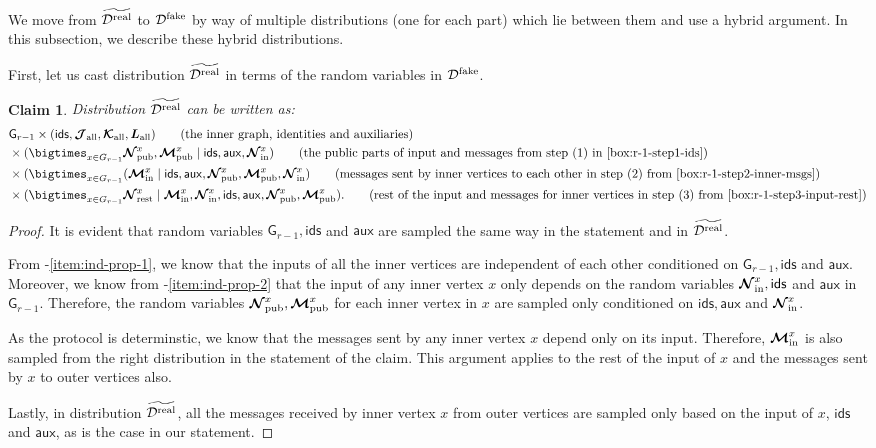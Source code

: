 \documentclass[11pt]{article}
\newtheorem{claim}[lemma]{Claim}
\theoremstyle{definition}
\newcommand{\rv}[1]{\ensuremath{{\mathsf{#1}}}\xspace}
\newcommand{\rNinner}[2]{\ensuremath{\bm{\mathcal{N}}_{\textnormal{in}}^{#1_{#2}}}}
\newcommand{\cD}{\ensuremath{\mathcal{D}}}
\newcommand{\cDreal}{\ensuremath{\cD^{\textnormal{real}}}}
\newcommand{\cDrealtil}{\ensuremath{\widetilde{\cDreal}}}
\newcommand{\cDfake}{\ensuremath{\cD^{\textnormal{fake}}}}
\newcommand{\raux}{\ensuremath{\rv{aux}}}
\newcommand{\rcJall}{\ensuremath{\bm{\mathcal{J}}_{\textnormal{all}}}}
\newcommand{\rcKall}{\ensuremath{\bm{\mathcal{K}}_{\textnormal{all}}}}
\newcommand{\rLall}{\ensuremath{\bm{L}_{\textnormal{all}}}}
\newcommand{\rNpub}[1]{\ensuremath{\bm{\mathcal{N}}_{\textnormal{pub}}^{#1}}}
\newcommand{\rMpub}[1]{\ensuremath{\bm{\mathcal{M}}_{\textnormal{pub}}^{#1}}}
\newcommand{\rMinner}[1]{\ensuremath{\bm{\mathcal{M}}_{\textnormal{in}}^{#1}}}
\newcommand{\rNrest}[1]{\ensuremath{\bm{\mathcal{N}}^{#1}_{\textnormal{rest}}}}
\newcommand{\rG}{\ensuremath{\rv{G}}}
\newcommand{\rids}{\ensuremath{\rv{ids}}}
\begin{document}
We move from $\cDrealtil$ to $\cDfake$ by way of multiple distributions (one for each part) which lie between them and use a hybrid argument. In this subsection, we describe these hybrid distributions. 

First, let us cast distribution $\cDrealtil $ in terms of the random variables in $\cDfake$.

\begin{claim}\label{clm:cDrealtil-new-way}
	Distribution $\cDrealtil$ can be written as:
	\begin{align*}
		&\rG_{r-1} \times (\rids, \rcJall, \rcKall, \rLall) \tag{the inner graph, identities and auxiliaries}\\
		&\times (\bigtimes_{x \in G_{r-1}} \rNpub{x}, \rMpub{x} \mid \rids, \raux, \rNinner{x}{}) \tag{the public parts of input and messages from step (1) in \Cref{box:r-1-step1-ids}} \\
		&\times (\bigtimes_{x \in G_{r-1}} (\rMinner{x} \mid  \rids, \raux, \rNpub{x}, \rMpub{x}, \rNinner{x}{})   \tag{messages sent by inner vertices to each other in step (2) from \Cref{box:r-1-step2-inner-msgs}} \\
		&\times (\bigtimes_{x \in G_{r-1}}  \rNrest{x} \mid \rMinner{x}, \rNinner{x}{}, \rids, \raux, \rNpub{x}, \rMpub{x}). \tag{rest of the input and messages for inner vertices in step (3) from \Cref{box:r-1-step3-input-rest}}
	\end{align*}
\end{claim}

\begin{proof}
It is evident that random variables $\rG_{r-1}, \rids$ and $\raux$ are sampled the same way in the statement and in $\cDrealtil$. 

From -\ref{item:ind-prop-1}, we know that the inputs of all the inner vertices are independent of each other conditioned on $\rG_{r-1}, \rids$ and $\raux$. Moreover, we know from -\ref{item:ind-prop-2} that the input of any inner vertex $x$ only depends on the random variables $\rNinner{x}{}, \rids$ and $\raux$  in $\rG_{r-1}$. Therefore, the random variables $\rNpub{x}, \rMpub{x}$ for each inner vertex in $x$ are sampled only conditioned on $\rids, \raux$ and $\rNinner{x}{}$. 

As the protocol is determinstic, we know that the messages sent by any inner vertex $x$ depend only on its input. Therefore, $\rMinner{x}$ is also sampled from the right distribution in the statement of the claim. This argument applies to the rest of the input of $x$ and the messages sent by $x$ to outer vertices also. 

Lastly, in distribution $\cDrealtil$, all the messages received by inner vertex $x$ from outer vertices are sampled only based on the input of $x$, $\rids$ and $\raux$, as is the case in our statement. 
\end{proof}
\end{document}
